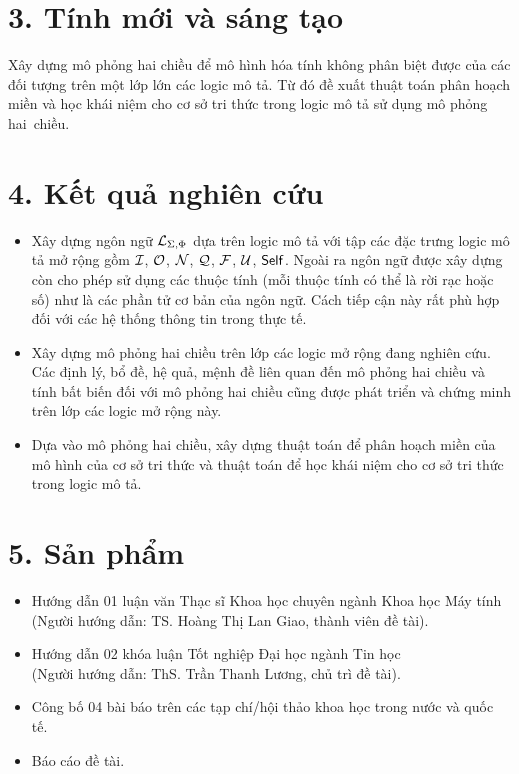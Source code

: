 \section*{3. Tính mới và sáng tạo}
Xây dựng mô phỏng hai chiều để mô hình hóa tính không phân biệt được của các đối tượng trên một lớp lớn các logic mô tả. Từ đó đề xuất thuật toán phân hoạch miền và học khái niệm cho cơ sở tri thức trong logic mô tả sử dụng mô phỏng hai~chiều.

\section*{4. Kết quả nghiên cứu}
\begin{itemize}
	\item Xây dựng ngôn ngữ $\mathcal{L}_{\Sigma,\Phi}$ dựa trên logic mô tả \ALCreg với tập các đặc trưng logic mô tả mở rộng gồm $\mathcal{I}$, $\mathcal{O}$, $\mathcal{N}$, $\mathcal{Q}$, $\mathcal{F}$, $\mathcal{U}$, $\mathsf{Self}$. Ngoài ra ngôn ngữ được xây dựng còn cho phép sử dụng các thuộc tính (mỗi thuộc tính có thể là rời rạc hoặc số) như là các phần tử cơ bản của ngôn ngữ. Cách tiếp cận này rất phù hợp đối với các hệ thống thông tin trong thực tế.
	
	\item Xây dựng mô phỏng hai chiều trên lớp các logic mở rộng đang nghiên cứu. Các định lý, bổ đề, hệ quả, mệnh đề liên quan đến mô phỏng hai chiều và tính bất biến đối với mô phỏng hai chiều cũng được phát triển và chứng minh trên lớp các logic mở rộng này.
	
	\item Dựa vào mô phỏng hai chiều, xây dựng thuật toán để phân hoạch miền của mô hình của cơ sở tri thức và thuật toán \BBCLearnS để học khái niệm cho cơ sở tri thức trong logic mô tả.
\end{itemize}
\section*{5. Sản phẩm}
\begin{itemize}
	\item Hướng dẫn 01 luận văn Thạc sĩ Khoa học chuyên ngành Khoa học Máy tính\\
	(Người hướng dẫn: TS. Hoàng Thị Lan Giao, thành viên đề tài).
	\item Hướng dẫn 02 khóa luận Tốt nghiệp Đại học ngành Tin học\\
	(Người hướng dẫn: ThS. Trần Thanh Lương, chủ trì đề tài).
	\item Công bố 04 bài báo trên các tạp chí/hội thảo khoa học trong nước và quốc tế.
	\item Báo cáo đề tài.
\end{itemize}
